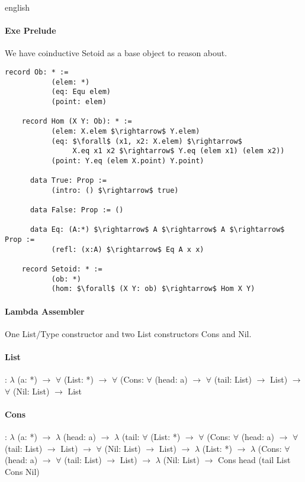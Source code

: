 \documentclass{abstract}
\begin{document}
\begin{theses}{english}
\paragraph{Exe Prelude}

We have coinductive Setoid as a base object to reason about.

\begin{lstlisting}[mathescape=true]
    record Ob: * :=
           (elem: *)
           (eq: Equ elem)
           (point: elem)

    record Hom (X Y: Ob): * :=
           (elem: X.elem $\rightarrow$ Y.elem)
           (eq: $\forall$ (x1, x2: X.elem) $\rightarrow$ 
                X.eq x1 x2 $\rightarrow$ Y.eq (elem x1) (elem x2))
           (point: Y.eq (elem X.point) Y.point)

      data True: Prop :=
           (intro: () $\rightarrow$ true)

      data False: Prop := ()

      data Eq: (A:*) $\rightarrow$ A $\rightarrow$ A $\rightarrow$ Prop :=
           (refl: (x:A) $\rightarrow$ Eq A x x)

    record Setoid: * :=
           (ob: *)
           (hom: $\forall$ (X Y: ob) $\rightarrow$ Hom X Y)
\end{lstlisting}

\newpage
\paragraph{Lambda Assembler}

One List/Type constructor and two List constructors Cons and Nil.


\paragraph{List}: $\lambda$ (a: *)
$\rightarrow$ $\forall$ (List: *)
$\rightarrow$ $\forall$ (Cons:
    $\forall$ (head: a)
  $\rightarrow$ $\forall$ (tail: List)
  $\rightarrow$ List)
$\rightarrow$ $\forall$ (Nil: List)
$\rightarrow$ List\\

\paragraph{Cons}: $\lambda$ (a: *)
$\rightarrow$ $\lambda$ (head: a)
$\rightarrow$ $\lambda$ (tail:
    $\forall$ (List: *)
  $\rightarrow$ $\forall$ (Cons:
      $\forall$ (head: a)
    $\rightarrow$ $\forall$ (tail: List)
    $\rightarrow$ List)
  $\rightarrow$ $\forall$ (Nil: List)
  $\rightarrow$ List)
$\rightarrow$ $\lambda$ (List: *)
$\rightarrow$ $\lambda$ (Cons:
    $\forall$ (head: a)
  $\rightarrow$ $\forall$ (tail: List)
  $\rightarrow$ List)
$\rightarrow$ $\lambda$ (Nil: List)
$\rightarrow$ Cons head (tail List Cons Nil)\\


\end{theses}
\end{document}
